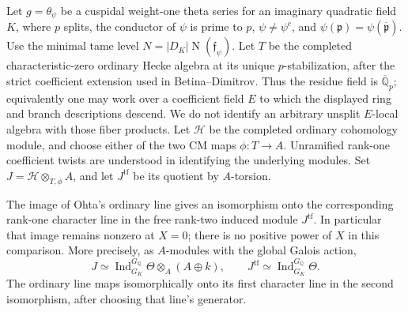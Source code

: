 \begin{proposition}
\label{AC-K29-irregular-saturation}
Let \(g=\theta_\psi\) be a cuspidal weight-one theta series for an
imaginary quadratic field \(K\), where \(p\) splits, the conductor of
\(\psi\) is prime to \(p\), \(\psi\neq\psi^c\), and
\(\psi(\mathfrak p)=\psi(\overline{\mathfrak p})\).
Use the minimal tame level
\(N=|D_K|\operatorname N(\mathfrak f_\psi)\).
Let \(T\) be the completed characteristic-zero ordinary Hecke algebra
at its unique \(p\)-stabilization, after the strict coefficient
extension used in Betina--Dimitrov.  Thus the residue field is
\(\overline{\mathbb Q}_p\); equivalently one may work over a
coefficient field \(E\) to which the displayed ring and branch
descriptions descend.  We do not identify an arbitrary unsplit
\(E\)-local algebra with those fiber products.  Let \(\mathcal H\) be the completed
ordinary cohomology module, and choose either of the two CM maps
\(\phi:T\to A\).  Unramified rank-one coefficient twists are
understood in identifying the underlying modules.  Set
\(J=\mathcal H\otimes_{T,\phi}A\), and let
\(J^{\mathrm{tf}}\) be its quotient by \(A\)-torsion.

The image of Ohta's ordinary line gives an isomorphism onto the
corresponding rank-one character line in the free rank-two induced
module \(J^{\mathrm{tf}}\).  In particular that image remains nonzero
at \(X=0\); there is no positive power of \(X\) in this comparison.
More precisely, as \(A\)-modules with the global Galois action,
\[
 J\simeq\operatorname{Ind}_{G_K}^{G_{\mathbb Q}}\Theta
             \otimes_A(A\oplus k),\qquad
 J^{\mathrm{tf}}\simeq
             \operatorname{Ind}_{G_K}^{G_{\mathbb Q}}\Theta.       \tag{CIS.6}
\]
The ordinary line maps isomorphically onto its first character line
in the second isomorphism, after choosing that line's generator.
\end{proposition}

